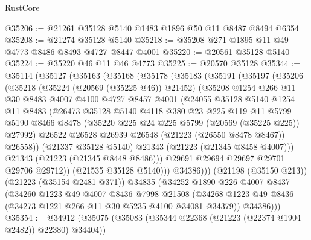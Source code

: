 \begin{lexlean}{RustCore}
\begin{coremodule}
@35206 := @21261 @35128 @5140 @1483 @1896 @50 @11 @8487 @8494 @6354
@35208 := @21274 @35128 @5140
@35218 := @35208 @271 @1895 @11 @49 @4773 @8486 @8493 @4727 @8447 @4001
@35220 := @20561 @35128 @5140
@35224 := @35220 @46 @11 @46 @4773
@35225 := @20570 @35128
@35344 := @35114
    (@35127
      (@35163
        (@35168
          (@35178
            (@35183
              (@35191
                (@35197
                  (@35206
                    (@35218
                      (@35224 (@20569 (@35225 @46)) @21452)
                      (@35208
                        @1254
                        @266
                        @11
                        @30
                        @8483
                        @4007
                        @4100
                        @4727
                        @8457
                        @4001
                        (@24055
                          @35128
                          @5140
                          @1254
                          @11
                          @8483
                          (@26473
                            @35128
                            @5140
                            @4118
                            @380
                            @23
                            @225
                            @119
                            @11
                            @5799
                            @5190
                            @8466
                            @8478
                            (@35220 @225 @24 @225 @5799 (@20569 (@35225 @225)) @27992)
                            @26522
                            @26528
                            @26939
                            @26548
                            (@21223 (@26550 @8478 @8467))
                            @26558))
                        (@21337 @35128 @5140)
                        @21343
                        (@21223 (@21345 @8458 @4007)))
                      @21343
                      (@21223 (@21345 @8448 @8486)))
                    @29691
                    @29694
                    @29697
                    @29701
                    @29706
                    @29712))
                (@21535 @35128 @5140)))
            @34386)))
      (@21198 (@35150 @213))
      (@21223 (@35154 @2481 @371))
      @34835
      (@34252
        @1890
        @226
        @4007
        @8437
        (@34260
          @1223
          @49
          @4007
          @8436
          @7998
          @21508
          (@34268 @1223 @49 @8436 (@34273 @1221 @266 @11 @30 @5235 @4100 @34081 @34379))
          @34386)))
@35354 := @34912 (@35075 (@35083 (@35344 @22368 (@21223 (@22374 @1904 @2482)) @22380) @34404))

\end{coremodule}
\end{lexlean}

